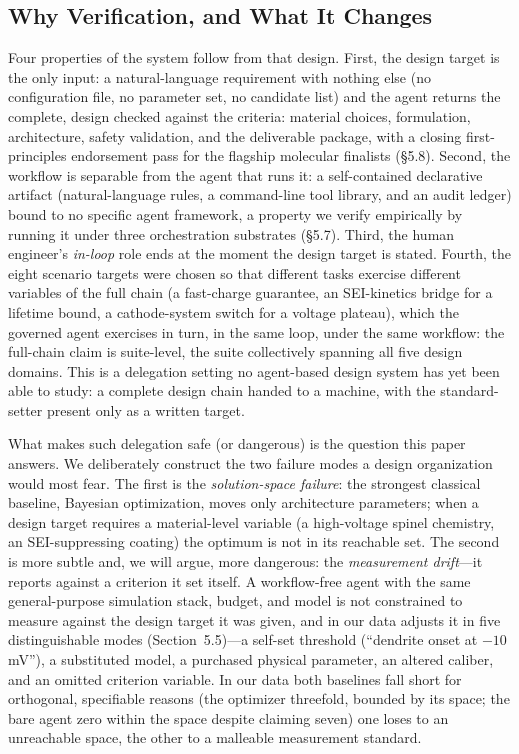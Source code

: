\subsection{Why Verification, and What It Changes}

Four properties of the system follow from that design. First, the design target
is the only input: a natural-language requirement with nothing else (no
configuration file, no parameter set, no candidate list) and the agent
returns the complete, design checked against the criteria: material choices, formulation,
architecture, safety validation, and the deliverable package, with a
closing first-principles endorsement pass for the flagship molecular
finalists (§5.8). Second, the workflow is separable from the agent that runs
it: a self-contained declarative artifact (natural-language rules, a
command-line tool library, and an audit ledger) bound to no specific agent
framework, a property we verify empirically by running it under three
orchestration substrates (§5.7). Third, the human engineer's \emph{in-loop}
role ends at the moment the design target is stated. Fourth, the eight scenario
targets were chosen so that different tasks exercise different variables of
the full chain (a fast-charge guarantee, an SEI-kinetics bridge for a
lifetime bound, a cathode-system switch for a voltage plateau), which the
governed agent exercises in turn, in the same loop, under the same
workflow: the full-chain claim is suite-level, the suite collectively
spanning all five design domains. This is a delegation setting no
agent-based design system has yet been able to study: a complete design
chain handed to a machine, with the standard-setter present only as a
written target.

What makes such delegation safe (or dangerous) is the question this paper
answers. We deliberately construct the two failure modes a design organization
would most fear. The first is the \emph{solution-space failure}: the strongest
classical baseline, Bayesian optimization, moves only architecture parameters;
when a design target requires a material-level variable (a high-voltage spinel chemistry, an
SEI-suppressing coating) the optimum is not in its reachable set. The
second is more subtle and, we will argue, more dangerous: the
\emph{measurement drift}---it reports against a criterion it set itself. A workflow-free agent with the same general-purpose
simulation stack, budget,
and model is not constrained to measure against the design target it was given,
and in our data adjusts it in five distinguishable modes (Section~5.5)---a
self-set threshold (``dendrite onset at $-10$ mV''), a substituted model, a
purchased physical parameter, an altered caliber, and an omitted criterion
variable. In our data both baselines fall short for orthogonal,
specifiable reasons (the optimizer threefold, bounded by its space; the
bare agent zero within the space despite claiming seven) one loses to an
unreachable space, the other to a malleable measurement standard.

